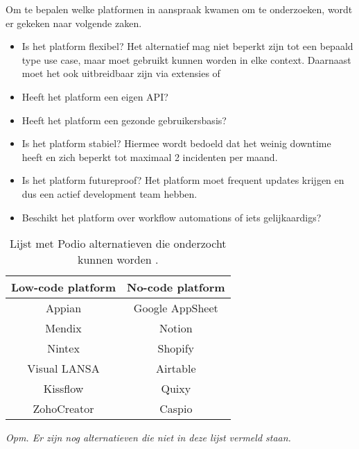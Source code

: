 Om te bepalen welke platformen in aanspraak kwamen om te onderzoeken, wordt er gekeken naar volgende zaken.

\begin{itemize}
    \item Is het platform flexibel? Het alternatief mag niet beperkt zijn tot een bepaald type use case, maar moet gebruikt kunnen worden in elke context. Daarnaast moet het ook uitbreidbaar zijn via extensies of 
    \item Heeft het platform een eigen API?
    \item Heeft het platform een gezonde gebruikersbasis? %
    \item Is het platform stabiel? Hiermee wordt bedoeld dat het weinig downtime heeft en zich beperkt tot maximaal 2 incidenten per maand. 
    \item Is het platform futureproof? Het platform moet frequent updates krijgen en dus een actief development team hebben.
    \item Beschikt het platform over workflow automations of iets gelijkaardigs?
\end{itemize}

\begin{table}[ht]
    \centering
    \caption{\label{tab:Tabel 3} Lijst met Podio alternatieven die onderzocht kunnen worden \autocite{Tasmia2022}.}
    \begin{tabular}{ | c | c | }
        \hline
        \textbf{Low-code platform} & \textbf{No-code platform} \\
        \hline\hline
        Appian & Google AppSheet \\
        Mendix & Notion \\
        Nintex & Shopify \\
        Visual LANSA & Airtable \\
        Kissflow & Quixy \\
        ZohoCreator & Caspio \\
        \hline
    \end{tabular}
    
    {\raggedright \textit{Opm. Er zijn nog alternatieven die niet in deze lijst vermeld staan.} \par}
\end{table}

